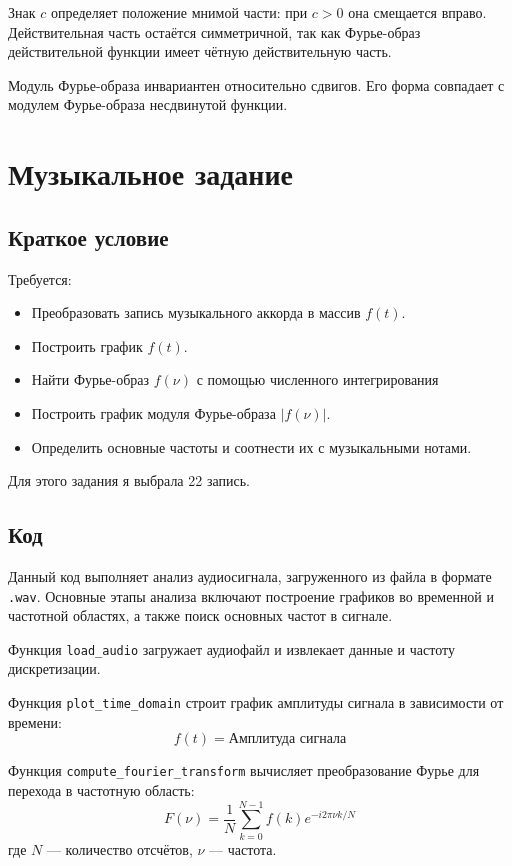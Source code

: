 \documentclass[a4paper,12pt]{article}
\begin{document}
Знак \( c \) определяет положение мнимой части: при \( c > 0 \) она смещается вправо. Действительная часть остаётся симметричной, так как Фурье-образ действительной функции имеет чётную действительную часть.

Модуль Фурье-образа инвариантен относительно сдвигов. Его форма совпадает с модулем Фурье-образа несдвинутой функции.


\newpage
\section{Музыкальное задание}
\subsection{Краткое условие}

Требуется:
\begin{itemize}
    \item Преобразовать запись музыкального аккорда в массив \( f(t) \).
    \item Построить график \( f(t) \).
    \item Найти Фурье-образ \( f(\nu) \) с помощью численного интегрирования
    \item Построить график модуля Фурье-образа \( |f(\nu)| \).
    \item Определить основные частоты и соотнести их с музыкальными нотами.
\end{itemize}

Для этого задания я выбрала 22 запись.
\subsection{Код}








Данный код выполняет анализ аудиосигнала, загруженного из файла в формате \texttt{.wav}. Основные этапы анализа включают построение графиков во временной и частотной областях, а также поиск основных частот в сигнале.


Функция \texttt{load\_audio} загружает аудиофайл и извлекает данные и частоту дискретизации.

Функция \texttt{plot\_time\_domain} строит график амплитуды сигнала в зависимости от времени:
\[
f(t) = \text{Амплитуда сигнала}
\]

Функция \texttt{compute\_fourier\_transform} вычисляет преобразование Фурье для перехода в частотную область:
\[
F(\nu) = \frac{1}{N} \sum_{k=0}^{N-1} f(k) e^{-i 2 \pi \nu k / N}
\]
где \( N \) — количество отсчётов, \( \nu \) — частота.
\end{document}
